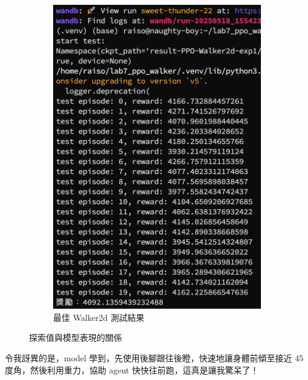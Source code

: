\begin{figure}[h]
\begin{subfigure}[b]{0.48\textwidth}
        \includegraphics[width=\textwidth]{figures/Top_walk2d_test_result.png}
        \caption{最佳 Walker2d 測試結果}
        \label{fig:top_walk2d_test}
    \end{subfigure}
    \caption{探索值與模型表現的關係}
    \label{fig:exploration_and_performance}
\end{figure}



令我訝異的是，model 學到，先使用後腳跟往後瞪，快速地讓身體前傾至接近 45 度角，然後利用重力，協助 agent 快快往前跑，這真是讓我驚呆了！

